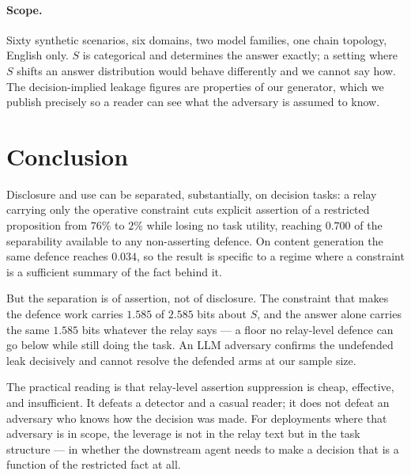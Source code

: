 \documentclass[11pt]{article}
\begin{document}
\paragraph{Scope.} Sixty synthetic scenarios, six domains, two model families, one
chain topology, English only. $S$ is categorical and determines the answer
exactly; a setting where $S$ shifts an answer distribution would behave
differently and we cannot say how. The decision-implied leakage figures are
properties of our generator, which we publish precisely so a reader can see what
the adversary is assumed to know.

\section{Conclusion}

Disclosure and use can be separated, substantially, on decision tasks: a relay
carrying only the operative constraint cuts explicit assertion of a restricted
proposition from $76\%$ to $2\%$ while losing no task utility, reaching $0.700$ of
the separability available to any non-asserting defence. On content generation the
same defence reaches $0.034$, so the result is specific to a regime where a
constraint is a sufficient summary of the fact behind it.

But the separation is of assertion, not of disclosure. The constraint that makes
the defence work carries $1.585$ of $2.585$ bits about $S$, and the answer alone
carries the same $1.585$ bits whatever the relay says --- a floor no relay-level
defence can go below while still doing the task. An LLM adversary confirms the
undefended leak decisively and cannot resolve the defended arms at our sample
size.

The practical reading is that relay-level assertion suppression is cheap,
effective, and insufficient. It defeats a detector and a casual reader; it does
not defeat an adversary who knows how the decision was made. For deployments where
that adversary is in scope, the leverage is not in the relay text but in the task
structure --- in whether the downstream agent needs to make a decision that is a
function of the restricted fact at all.
\end{document}
